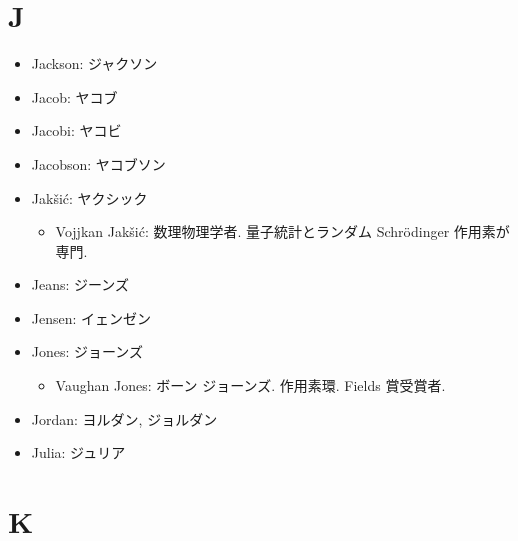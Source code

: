 \documentclass[openany, a4paper, oneside]{jsbook}
\begin{document}
\section{J}

\begin{itemize}
\item Jackson: ジャクソン
\item Jacob: ヤコブ
\item Jacobi: ヤコビ
\item Jacobson: ヤコブソン
\item Jak\v{s}i\'c: ヤクシック
\begin{itemize}
\item Vojjkan Jak\v{s}i\'c: 数理物理学者. 量子統計とランダム Schr\"odinger 作用素が専門.
\end{itemize}
\item Jeans: ジーンズ
\item Jensen: イェンゼン
\item Jones: ジョーンズ
\begin{itemize}
\item Vaughan Jones: ボーン ジョーンズ. 作用素環. Fields 賞受賞者.
\end{itemize}
\item Jordan: ヨルダン, ジョルダン
\item Julia: ジュリア
\end{itemize}
\section{K}
\end{document}
